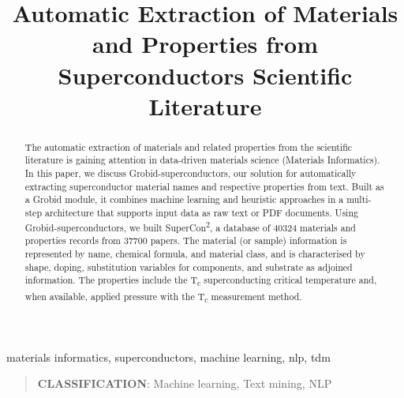 \documentclass[]{interact}
\theoremstyle{plain}%
\theoremstyle{definition}
\theoremstyle{remark}
\begin{document}

\title{Automatic Extraction of Materials and Properties from Superconductors Scientific Literature}

\author{
}

\maketitle


\begin{abstract}
    The automatic extraction of materials and related properties from the scientific literature is gaining attention in data-driven materials science (Materials Informatics).
    In this paper, we discuss Grobid-superconductors, our solution for automatically extracting superconductor material names and respective properties from text.
    Built as a Grobid module, it combines machine learning and heuristic approaches in a multi-step architecture that supports input data as raw text or PDF documents.
    Using Grobid-superconductors, we built SuperCon\textsuperscript{2}, a database of 40324 materials and properties records from 37700 papers.
    The material (or sample) information is represented by name, chemical formula, and material class, and is characterised by shape, doping, substitution variables for components, and substrate as adjoined information.
    The properties include the T\textsubscript{c} superconducting critical temperature and, when available, applied pressure with the T\textsubscript{c} measurement method.
\end{abstract}

\begin{keywords}
    materials informatics, superconductors, machine learning, nlp, tdm
\end{keywords}

\begin{quote}
    \textbf{CLASSIFICATION}: Machine learning, Text mining, NLP
\end{quote}
\end{document}
